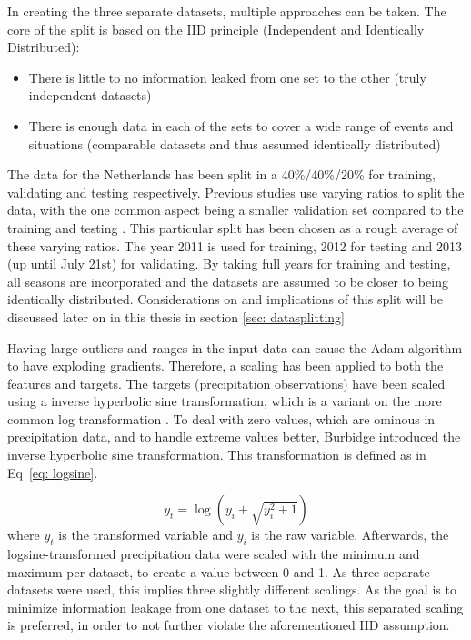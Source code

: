 \documentclass[twocolumn, 10pt, a4paper]{memoir}
\begin{document}
	In creating the three separate datasets, multiple approaches can be taken. The core of the split is based on the IID principle (Independent and Identically Distributed):
	
	\begin{itemize}
		\item There is little to no information leaked from one set to the other (truly independent datasets)
		\item There is enough data in each of the sets to cover a wide range of events and situations (comparable datasets and thus assumed identically distributed)
	\end{itemize}
	The data for the Netherlands has been split in a 40\%/40\%/20\% for training, validating and testing respectively. Previous studies use varying ratios to split the data, with the one common aspect being a smaller validation set compared to the training and testing \cite{Polz2020,Diba2021,Pudashine2020}. This particular split has been chosen as a rough average of these varying ratios.
	The year 2011 is used for training, 2012 for testing and 2013 (up until July 21st) for validating. By taking full years for training and testing, all seasons are incorporated and the datasets are assumed to be closer to being identically distributed. Considerations on and implications of this split will be discussed later on in this thesis in section \ref{sec: datasplitting}
	
	Having large outliers and ranges in the input data can cause the Adam algorithm to have exploding gradients. Therefore, a scaling has been applied to both the features and targets. 
	The targets (precipitation observations) have been scaled using a inverse hyperbolic sine transformation, which is a variant on the more common log transformation \cite{Kilmartin1972}. To deal with zero values, which are ominous in precipitation data, and to handle extreme values better, Burbidge  introduced the inverse hyperbolic sine transformation. This transformation is defined as in Eq~\ref{eq: logsine}.
	
	\begin{equation}
		\label{eq: logsine}
		y_t = \log(y_i + \sqrt{y_i^2 + 1})
	\end{equation}
	where $y_t$ is the transformed variable and $y_i$ is the raw variable.
	Afterwards, the logsine-transformed precipitation data were scaled with the minimum and maximum per dataset, to create a value between 0 and 1. As three separate datasets were used, this implies three slightly different scalings. As the goal is to minimize information leakage from one dataset to the next, this separated scaling is preferred, in order to not further violate the aforementioned IID assumption.
	
\end{document}
